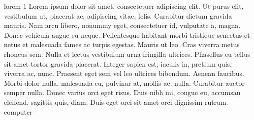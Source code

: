 \documentclass[12pt, a4paper, twoside]{report}
\begin{document}
\newpage

\gls{lorem 1}
Lorem ipsum dolor sit amet, consectetuer adipiscing elit. Ut purus elit, vestibulum ut,
placerat ac, adipiscing vitae, felis. Curabitur dictum gravida mauris. Nam arcu libero,
nonummy eget, consectetuer id, vulputate a, magna. Donec vehicula augue eu neque.
Pellentesque habitant morbi tristique senectus et netus et malesuada fames ac turpis
egestas. Mauris ut leo. Cras viverra metus rhoncus sem. Nulla et lectus vestibulum urna
fringilla ultrices. Phasellus eu tellus sit amet tortor gravida placerat. Integer sapien est,
iaculis in, pretium quis, viverra ac, nunc. Praesent eget sem vel leo ultrices bibendum.
Aenean faucibus. Morbi dolor nulla, malesuada eu, pulvinar at, mollis ac, nulla. Curabitur
auctor semper nulla. Donec varius orci eget risus. Duis nibh mi, congue eu, accumsan
eleifend, sagittis quis, diam. Duis eget orci sit amet orci dignissim rutrum.\\

\gls{computer}






\printglossaries


\printindex




\end{document}
